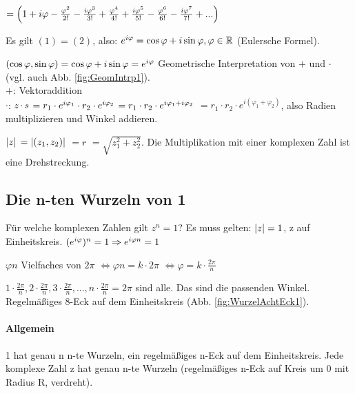 $= \left( 1 + i \varphi - \frac{\varphi^2}{2!} - \frac{i \varphi^3}{3!} + \frac{\varphi^4}{4!} + \frac{i \varphi^5}{5!} - \frac{\varphi^6}{6!} - \frac{i \varphi^7}{7!} + ... \right) $

Es gilt $(1) = (2)$, also: $ e^{i\varphi} = \cos \varphi + i \sin \varphi, \varphi \in \mathbb{R}$ (Eulersche Formel).

$(\cos\varphi,\sin\varphi) = \cos\varphi + i\sin\varphi = e^{i\varphi}$
Geometrische Interpretation von $+$ und $\cdot$ (vgl. auch Abb. \ref{fig:GeomIntrp1}).\\
$+$: Vektoraddition\\
$\cdot$: $z\cdot s$
$=r_1 \cdot e^{i\varphi_1} \cdot r_2 \cdot e^{i\varphi_2}$
$= r_1\cdot r_2\cdot e^{i\varphi_1 + i\varphi_2}$
$= r_1\cdot r_2\cdot e^{i(\varphi_1 + \varphi_2)}$, also Radien multiplizieren und Winkel addieren. 

$ \left\vert z \right\vert $
$= \left\vert (z_1,z_2) \right\vert $
$=r$
$=\sqrt{z_1^2 + z_2^2}$. Die Multiplikation mit einer komplexen Zahl ist eine Drehstreckung. 

\subsection{Die n-ten Wurzeln von 1}
Für welche komplexen Zahlen gilt $z^n=1$? Es muss gelten: $ \left\vert z \right\vert =1$, z auf Einheitskreis. 
$(e^{i\varphi})^n = 1 \Rightarrow e^{i\varphi n} = 1$

$\varphi n $ Vielfaches von $2\pi$
$\Leftrightarrow \varphi n = k\cdot 2\pi$
$\Leftrightarrow \varphi = k \cdot \frac{2\pi}{n}$

$1 \cdot \frac{2\pi}{n}, 2 \cdot \frac{2\pi}{n}, 3 \cdot \frac{2\pi}{n}, ..., n \cdot \frac{2\pi}{n} = 2\pi$ sind alle. Das sind die passenden Winkel. Regelmäßiges 8-Eck auf dem Einheitskreis (Abb. \ref{fig:WurzelAchtEck1}).

\paragraph{Allgemein}
1 hat genau n n-te Wurzeln, ein regelmäßiges n-Eck auf dem Einheitskreis. Jede komplexe Zahl z hat genau n-te Wurzeln (regelmäßiges n-Eck auf Kreis um 0 mit Radius R, verdreht).  
